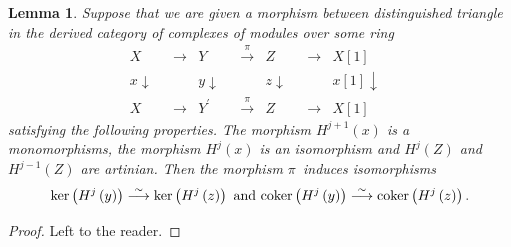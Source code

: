 \documentclass[asterisque,english]{smfart}
\newtheorem{lemma}[theo]{Lemma}
\begin{document}
\begin{lemma}\label{lemma:Marco}
Suppose that we are given a morphism between distinguished triangle in the derived category of
complexes of modules over some ring
\begin{equation*}
\begin{array}{ccccccc}
X & \longrightarrow  & Y & \overset{\pi }{\longrightarrow } & Z & 
\longrightarrow  & X\left[ 1\right]  \\ 
x\downarrow \text{ } &  & y\downarrow \text{ } &  & z\downarrow \text{ } & 
& x\left[ 1\right] \downarrow \text{ \ \ } \\ 
X & \longrightarrow  & Y^{\prime } & \overset{\pi }{\longrightarrow } & Z & 
\longrightarrow  & X\left[ 1\right] 
\end{array}
\end{equation*}
satisfying the following properties. The morphism $H^{j+1}\left( x\right) $
is a monomorphisms, the morphism $H^{j}\left( x\right) $ is an isomorphism
and $H^{j}\left( Z\right) $ and $H^{j-1}\left( Z\right) $ are artinian. Then
the morphism $\pi $\ induces isomorphisms%
\begin{equation*}
\mathrm{ker}\left( H^{j}\left( y\right) \right) \overset{\sim }{%
\longrightarrow }\mathrm{ker}\left( H^{j}\left( z\right) \right) \text{ and }%
\mathrm{coker}\left( H^{j}\left( y\right) \right) \overset{\sim }{%
\longrightarrow }\mathrm{coker}\left( H^{j}\left( z\right) \right) \text{.}
\end{equation*}
\end{lemma}
\begin{proof} Left to the reader.
\end{proof}
\end{document}

